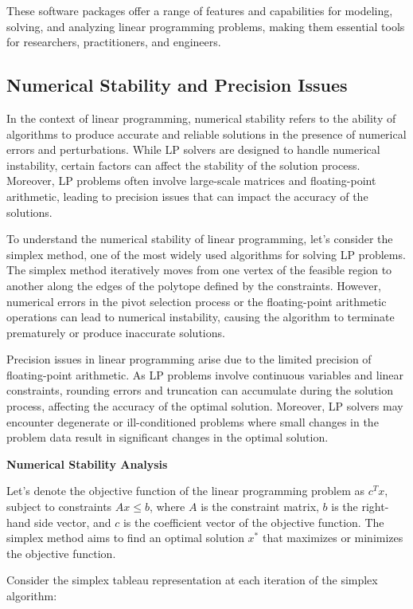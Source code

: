 \documentclass[12pt]{book} %
\begin{document}
These software packages offer a range of features and capabilities for modeling, solving, and analyzing linear programming problems, making them essential tools for researchers, practitioners, and engineers.

\subsection{Numerical Stability and Precision Issues}

In the context of linear programming, numerical stability refers to the ability of algorithms to produce accurate and reliable solutions in the presence of numerical errors and perturbations. While LP solvers are designed to handle numerical instability, certain factors can affect the stability of the solution process. Moreover, LP problems often involve large-scale matrices and floating-point arithmetic, leading to precision issues that can impact the accuracy of the solutions.

To understand the numerical stability of linear programming, let's consider the simplex method, one of the most widely used algorithms for solving LP problems. The simplex method iteratively moves from one vertex of the feasible region to another along the edges of the polytope defined by the constraints. However, numerical errors in the pivot selection process or the floating-point arithmetic operations can lead to numerical instability, causing the algorithm to terminate prematurely or produce inaccurate solutions.

Precision issues in linear programming arise due to the limited precision of floating-point arithmetic. As LP problems involve continuous variables and linear constraints, rounding errors and truncation can accumulate during the solution process, affecting the accuracy of the optimal solution. Moreover, LP solvers may encounter degenerate or ill-conditioned problems where small changes in the problem data result in significant changes in the optimal solution.

\textbf{Numerical Stability Analysis}

Let's denote the objective function of the linear programming problem as $c^Tx$, subject to constraints $Ax \leq b$, where $A$ is the constraint matrix, $b$ is the right-hand side vector, and $c$ is the coefficient vector of the objective function. The simplex method aims to find an optimal solution $x^*$ that maximizes or minimizes the objective function.

Consider the simplex tableau representation at each iteration of the simplex algorithm:
\end{document}
